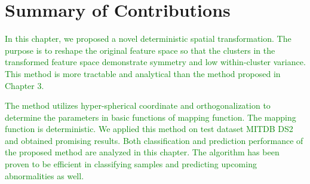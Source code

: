 \section{Summary of Contributions}

\textcolor{green}{In this chapter, we proposed a novel deterministic spatial transformation. The purpose is to reshape the original feature space so that the clusters in the transformed feature space demonstrate symmetry and low within-cluster variance. This method is more tractable and analytical than the method proposed in Chapter 3.}

\textcolor{green}{The method utilizes hyper-spherical coordinate and orthogonalization to determine the parameters in basic functions of mapping function. The mapping function is deterministic. We applied this method on test dataset MITDB DS2 and obtained promising results. Both classification and prediction performance of the proposed method are analyzed in this chapter. The algorithm has been proven to be efficient in classifying samples and predicting upcoming abnormalities as well. }
